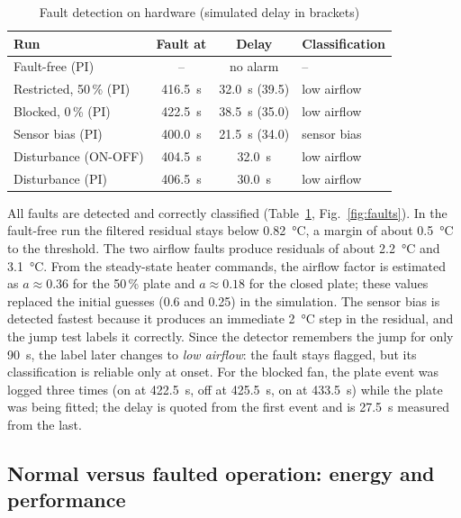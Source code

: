 \documentclass[conference,a4paper]{IEEEtran}
\begin{document}
\begin{table}[t]
\centering
\caption{Fault detection on hardware (simulated delay in brackets)}\label{tab:faults}
\setlength{\tabcolsep}{3pt}
\begin{tabular}{@{}lccl@{}}
\toprule
Run & Fault at & Delay & Classification \\
\midrule
Fault-free (PI)        & --              & no alarm              & -- \\
Restricted, 50\,\% (PI)& \SI{416.5}{s}   & \SI{32.0}{s} (39.5)   & low airflow \\
Blocked, 0\,\% (PI)    & \SI{422.5}{s}   & \SI{38.5}{s} (35.0)   & low airflow \\
Sensor bias (PI)       & \SI{400.0}{s}   & \SI{21.5}{s} (34.0)   & sensor bias \\
Disturbance (ON-OFF)   & \SI{404.5}{s}   & \SI{32.0}{s}          & low airflow \\
Disturbance (PI)       & \SI{406.5}{s}   & \SI{30.0}{s}          & low airflow \\
\bottomrule
\end{tabular}
\end{table}

All faults are detected and correctly classified (Table~\ref{tab:faults}, Fig.~\ref{fig:faults}).
In the fault-free run the filtered residual stays below \SI{0.82}{\celsius}, a margin of about
\SI{0.5}{\celsius} to the threshold. The two airflow faults produce residuals of about
\SI{+2.2}{\celsius} and \SI{+3.1}{\celsius}. From the steady-state heater commands, the airflow
factor is estimated as $a\approx0.36$ for the 50\,\% plate and $a\approx0.18$ for the closed plate;
these values replaced the initial guesses (0.6 and 0.25) in the simulation. The sensor bias is
detected fastest because it produces an immediate \SI{2}{\celsius} step in the residual, and the
jump test labels it correctly. Since the detector remembers the jump for only \SI{90}{s}, the label
later changes to \emph{low airflow}: the fault stays flagged, but its classification is reliable only
at onset. For the blocked fan, the plate event was logged three times (on at \SI{422.5}{s}, off at
\SI{425.5}{s}, on at \SI{433.5}{s}) while the plate was being fitted; the delay is quoted from the
first event and is \SI{27.5}{s} measured from the last.

\subsection{Normal versus faulted operation: energy and performance}
\begin{table}[t]
\centering
\caption{Heater use and tracking error after the fault ($t\geq\SI{450}{s}$), measured and true (raw sensor), hardware}\label{tab:energy}
\setlength{\tabcolsep}{3pt}

\end{table}
\end{document}
